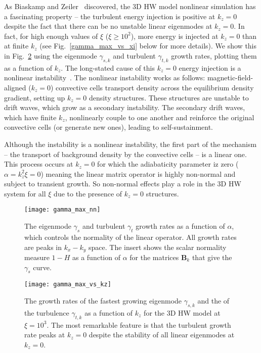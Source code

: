 \documentclass[twocolumn,showkeys,superscriptaddress]{revtex4}
\begin{document}
As Biaskamp and Zeiler~\cite{biskamp1995} discovered, the 3D HW model nonlinear simulation has a fascinating property -- 
the turbulent energy injection is positive at $k_z = 0$ despite the fact that there can be no unstable linear eigenmodes at $k_z=0$.
In fact, for high enough values of $\xi$ ($\xi \ge 10^2$), more energy is injected at $k_z = 0$ than at finite $k_z$ (see Fig.~\ref{gamma_max_vs_xi} below for more details).
We show this in Fig.~\ref{gamma_max_vs_kz} using the eigenmode $\gamma_{s,k}$ and turbulent $\gamma_{t,k}$ growth rates, plotting them as a function of $k_z$.
The long-stated cause of this $k_z=0$ energy injection is a nonlinear instability~\cite{biskamp1995,drake1995}. 
The nonlinear instability works as follows: magnetic-field-aligned ($k_z=0$) convective cells transport density across the equilibrium density gradient, setting up $k_z=0$ density structures. 
These structures are unstable to drift waves, which grow as a secondary instability.
The secondary drift waves, which have finite $k_z$, nonlinearly couple to one another and reinforce the original convective cells (or generate new ones), leading to self-sustainment.

Although the instability is a nonlinear instability, the first part of the mechanism -- the transport of background density by the convective cells -- is a linear one. This process occurs at $k_z=0$
for which the adiabaticity parameter iz zero ($\alpha = k_z^2 \xi = 0$) meaning the linear matrix operator is highly non-normal and subject to transient growth.
So non-normal effects play a role in the 3D HW system for all $\xi$ due to the presence of $k_z=0$ structures.

\begin{figure}
\centerline{\texttt{[image: gamma\_max\_nn]}}
\caption{The eigenmode $\gamma_{s}$ and turbulent $\gamma_{t}$ growth rates as a function of $\alpha$, which controls the normality of the linear operator. All growth rates are peaks in $k_x-k_y$ space.
The insert shows the scalar normality measure $1-H$ as a function of $\alpha$ for the matrices $\mathbf{B}_k$ that give the $\gamma_{s}$ curve.}
\label{gamma_max_vs_alpha}
\end{figure}

\begin{figure}
\centerline{\texttt{[image: gamma\_max\_vs\_kz]}}
\caption{The growth rates of the fastest growing eigenmode $\gamma_{s,k}$ and the of the turbulence $\gamma_{t,k}$ as a function of $k_z$ for the 3D HW model at $\xi = 10^3$. The most remarkable feature is
that the turbulent growth rate peaks at $k_z=0$ despite the stability of all linear eigenmodes at $k_z=0$.}
\label{gamma_max_vs_kz}
\end{figure}
\end{document}
